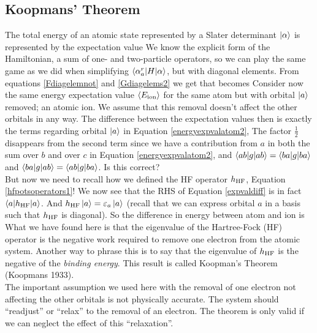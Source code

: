\subsection{Koopmans' Theorem}
The total energy of an atomic state represented by a Slater determinant $\ket{\alpha}$ is represented by the expectation value
We know the explicit form of the Hamiltonian, a sum of one- and two-particle operators, so we can play the same game as we did when simplifying $\braket{\alpha_a^r|H|\alpha}$, but with diagonal elements. From equations \eqref{Fdiagelemnot} and \eqref{Gdiagelems2} we get that
becomes
Consider now the same energy expectation value $\braket{E_{\text{ion}}}$ for the same atom but with orbital $\ket{a}$ removed; an atomic ion. We assume that this removal doesn't affect the other orbitals in any way. The difference between the expectation values then is exactly the terms regarding orbital $\ket{a}$ in Equation \eqref{energyexpvalatom2},
The factor $\frac{1}{2}$ disappears from the second term since we have a contribution from $a$ in both the sum over $b$ and over $c$ in Equation \eqref{energyexpvalatom2}, and $\braket{ab|g|ab} = \braket{ba|g|ba}$ and $\braket{ba|g|ab} = \braket{ab|g|ba}$. Is this correct?\\
\indent But now we need to recall how we defined the HF operator $h_{\text{HF}}$, Equation \eqref{hfpotsoperators1}! We now see that the RHS of Equation \eqref{expvaldiff} is in fact $\braket{a|h_{\text{HF}}|a}$. And $h_{\text{HF}}\ket{a} = \varepsilon_a\ket{a}$ (recall that we can express orbital $a$ in a basis such that $h_{\text{HF}}$ is diagonal). So the difference in energy between atom and ion is
What we have found here is that the eigenvalue of the Hartree-Fock (HF) operator is the negative work required to remove one electron from the atomic system. Another way to phrase this is to say that the eigenvalue of $h_{\text{HF}}$ is the negative of the \emph{binding energy}. This result is called Koopman's Theorem (Koopmans 1933).\\
\indent The important assumption we used here with the removal of one electron not affecting the other orbitals is not physically accurate. The system should ``readjust'' or ``relax'' to the removal of an electron. The theorem is only valid if we can neglect the effect of this ``relaxation''. 
